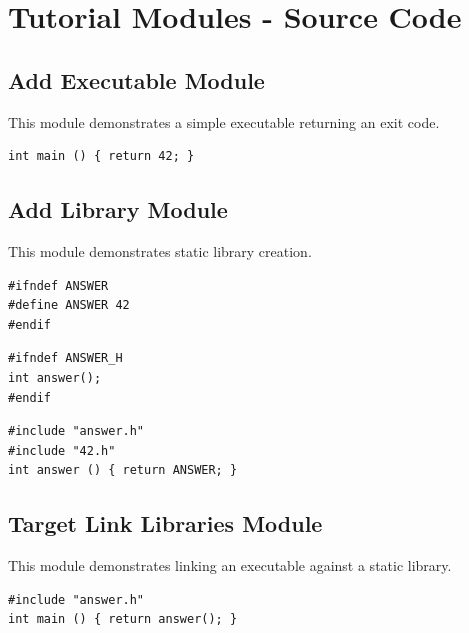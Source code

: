 \section{Tutorial Modules - Source Code}

\subsection{Add Executable Module}
This module demonstrates a simple executable returning an exit code.

\begin{verbatim}
int main () { return 42; }
\end{verbatim}

\subsection{Add Library Module}
This module demonstrates static library creation.

\begin{verbatim}
#ifndef ANSWER
#define ANSWER 42
#endif
\end{verbatim}

\begin{verbatim}
#ifndef ANSWER_H
int answer();
#endif
\end{verbatim}

\begin{verbatim}
#include "answer.h"
#include "42.h"
int answer () { return ANSWER; }
\end{verbatim}

\subsection{Target Link Libraries Module}
This module demonstrates linking an executable against a static library.

\begin{verbatim}
#include "answer.h"
int main () { return answer(); }
\end{verbatim}

